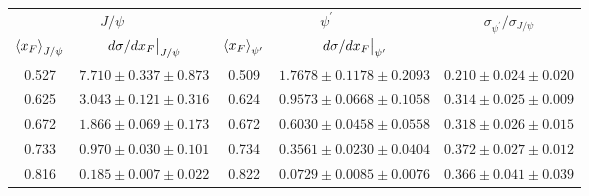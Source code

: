 \begin{tabular}{cc|cc|c}
\hline
\multicolumn{2}{c|}{$J/\psi$} &
  \multicolumn{2}{c|}{$\psi^{\prime}$} &
  \multirow{2}{*}{$\sigma_{\psi^\prime}/\sigma_{J/\psi}$} \\ \cline{1-4}
$\expval{x_F}_{J/\psi}$ &
  $\eval{d\sigma/dx_F}_{J/\psi}$ &
  $\expval{x_F}_{\psi^\prime}$ &
  $\eval{d\sigma/dx_F}_{\psi^\prime}$ &
   \\ \hline
\multicolumn{1}{c|}{0.527} &
  $7.710\pm0.337\pm0.873$ &
  \multicolumn{1}{c|}{0.509} &
  $1.7678\pm0.1178\pm0.2093$ &
  $0.210\pm0.024\pm0.020$ \\
\multicolumn{1}{c|}{0.625} &
  $3.043\pm0.121\pm0.316$ &
  \multicolumn{1}{c|}{0.624} &
  $0.9573\pm0.0668\pm0.1058$ &
  $0.314\pm0.025\pm0.009$ \\
\multicolumn{1}{c|}{0.672} &
  $1.866\pm0.069\pm0.173$ &
  \multicolumn{1}{c|}{0.672} &
  $0.6030\pm0.0458\pm0.0558$ &
  $0.318\pm0.026\pm0.015$ \\
\multicolumn{1}{c|}{0.733} &
  $0.970\pm0.030\pm0.101$ &
  \multicolumn{1}{c|}{0.734} &
  $0.3561\pm0.0230\pm0.0404$ &
  $0.372\pm0.027\pm0.012$ \\
\multicolumn{1}{c|}{0.816} &
  $0.185\pm0.007\pm0.022$ &
  \multicolumn{1}{c|}{0.822} &
  $0.0729\pm0.0085\pm0.0076$ &
  $0.366\pm0.041\pm0.039$ \\ \hline
\end{tabular}
